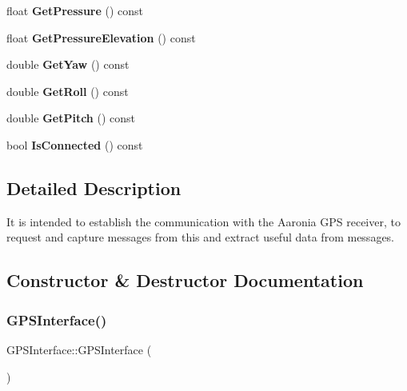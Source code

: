 \begin{DoxyCompactItemize}
\mbox{\label{classGPSInterface_a63ed7a32797c2fc7557bfdfdb74c43ed}} 
float {\bfseries Get\+Pressure} () const
\item 
\mbox{\label{classGPSInterface_ae6a0d54023d9b3be7ea8180e2a26a193}} 
float {\bfseries Get\+Pressure\+Elevation} () const
\item 
\mbox{\label{classGPSInterface_a5443691a26eb05587190cf631ffbcec3}} 
double {\bfseries Get\+Yaw} () const
\item 
\mbox{\label{classGPSInterface_a5cb902ccc2165294b4dacc7f660dcb5a}} 
double {\bfseries Get\+Roll} () const
\item 
\mbox{\label{classGPSInterface_a27f5655d78068177d901933528f3ac6f}} 
double {\bfseries Get\+Pitch} () const
\item 
\mbox{\label{classGPSInterface_a568715247cbcfa261d68a030df7bd1ef}} 
bool {\bfseries Is\+Connected} () const
\end{DoxyCompactItemize}


\subsection{Detailed Description}
It is intended to establish the communication with the Aaronia G\+PS receiver, to request and capture messages from this and extract useful data from messages. 

\subsection{Constructor \& Destructor Documentation}
\mbox{\label{classGPSInterface_a91c9f19d6588bcd34a8038bdc036c20c}} 
\subsubsection{\texorpdfstring{G\+P\+S\+Interface()}{GPSInterface()}}
{\footnotesize\ttfamily G\+P\+S\+Interface\+::\+G\+P\+S\+Interface (\begin{DoxyParamCaption}{ }\end{DoxyParamCaption})}



